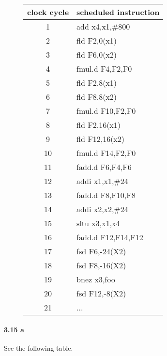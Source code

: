 \documentclass{article}
\begin{document}
\begin{figure}[!ht]
    \centering
    \begin{tabular}{c|l} %
        \toprule
        \textbf{clock cycle}&\textbf{scheduled instruction}\\
        \hline
        1&add    x4,x1,\#800\\
        \hline
        2&fld    F2,0(x1)\\
        \hline
        3&fld    F6,0(x2)\\
        \hline
        4&fmul.d    F4,F2,F0\\
        \hline
        5&fld    F2,8(x1)\\
        \hline
        6&fld    F8,8(x2)\\
        \hline
        7&fmul.d    F10,F2,F0\\
        \hline
        8&fld    F2,16(x1)\\
        \hline
        9&fld    F12,16(x2)\\
        \hline
        10&fmul.d    F14,F2,F0\\
        \hline
        11&fadd.d    F6,F4,F6\\
        \hline
        12&addi    x1,x1,\#24\\
        \hline
        13&fadd.d    F8,F10,F8\\
        \hline
        14&addi    x2,x2,\#24\\
        \hline
        15&sltu    x3,x1,x4\\
        \hline
        16&fadd.d    F12,F14,F12\\
        \hline
        17&fsd    F6,-24(X2)\\
        \hline
        18&fsd    F8,-16(X2)\\
        \hline
        19&bnez    x3,foo\\
        \hline
        20&fsd    F12,-8(X2)\\
        \hline
        21&...\\
        \bottomrule
    \end{tabular}
    \end{figure}
\newpage

\paragraph{3.15 a} See the following table.
\end{document}

